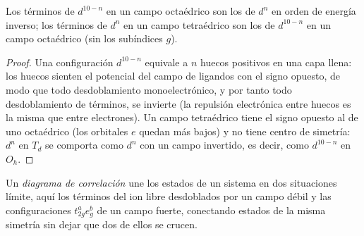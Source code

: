 \begin{proposition}\label{prop:b3:complex-spectra-magnetism:hole}
Los términos de $d^{10-n}$ en un campo octaédrico son los de $d^n$ en orden de energía
inverso; los términos de $d^n$ en un campo tetraédrico son los de $d^{10-n}$ en un campo
octaédrico (sin los subíndices $g$).
\end{proposition}

\begin{proof}
Una configuración $d^{10-n}$ equivale a $n$ huecos positivos en una capa llena: los
huecos sienten el potencial del campo de ligandos con el signo opuesto, de modo que todo
desdoblamiento monoelectrónico, y por tanto todo desdoblamiento de términos, se invierte (la
repulsión electrónica entre huecos es la misma que entre electrones). Un campo
tetraédrico tiene el signo opuesto al de uno octaédrico (los orbitales $e$
quedan más bajos) y no tiene centro de simetría: $d^n$ en $T_d$ se comporta como $d^n$ con un campo
invertido, es decir, como $d^{10-n}$ en $O_h$.
\end{proof}

\begin{definition}\label{def:b3:complex-spectra-magnetism:correlation}
Un \emph{diagrama de correlación} une los estados de un
sistema en dos situaciones límite, aquí los términos del ion libre desdoblados por un campo
débil y las configuraciones $t_{2g}^ae_g^b$ de un campo fuerte, conectando estados de la
misma simetría sin dejar que dos de ellos se crucen.
\end{definition}

